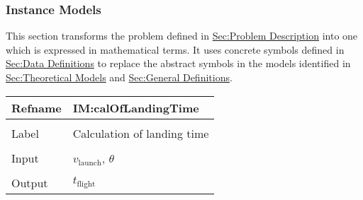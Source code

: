 \documentclass[12pt]{article}
\begin{document}
\subsubsection{Instance Models}
\label{Sec:IMs}
This section transforms the problem defined in \hyperref[Sec:ProbDesc]{Sec:Problem Description} into one which is expressed in mathematical terms. It uses concrete symbols defined in \hyperref[Sec:DDs]{Sec:Data Definitions} to replace the abstract symbols in the models identified in \hyperref[Sec:TMs]{Sec:Theoretical Models} and \hyperref[Sec:GDs]{Sec:General Definitions}.

\vspace{\baselineskip}
\noindent
\begin{minipage}{\textwidth}
\begin{tabular}{>{\raggedright}p{}>{\raggedright\arraybackslash}p{}}
\toprule \textbf{Refname} & \textbf{IM:calOfLandingTime}
\label{IM:calOfLandingTime}
\\ \midrule \\
Label & Calculation of landing time
        
\\ \midrule \\
Input & ${v_{\text{launch}}}$, $θ$
        
\\ \midrule \\
Output & ${t_{\text{flight}}}$
         

\end{tabular}
\end{minipage}
\end{document}

